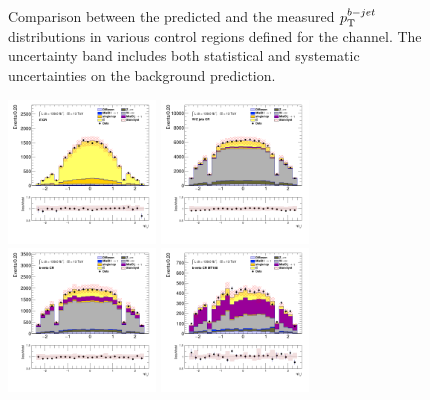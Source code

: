 \begin{figure}[!htp]
\begin{center}
			\end{center}
			\caption{
			Comparison between the predicted and the measured $p_{\text{T}}^{b-jet}$ distributions in various control regions defined for the \taujets channel. The uncertainty band includes both statistical and systematic uncertainties on the background prediction. 
			}
			\label{fig:bkg-bjet-pt-taujets}
		\end{figure}

		\begin{figure}[!htp]
			\begin{center}    
			\includegraphics[width=0.35\textwidth]{chapters/chapter6_HPlus/images/taujets/tau_0_eta_TTBAR.png}
			\includegraphics[width=0.35\textwidth]{chapters/chapter6_HPlus/images/taujets/tau_0_eta_WJETS.png} \\
			\includegraphics[width=0.35\textwidth]{chapters/chapter6_HPlus/images/taujets/tau_0_eta_BVETO.png}
			\includegraphics[width=0.35\textwidth]{chapters/chapter6_HPlus/images/taujets/tau_0_eta_BVETO_MT100.png} \\

\end{center}
\end{figure}
